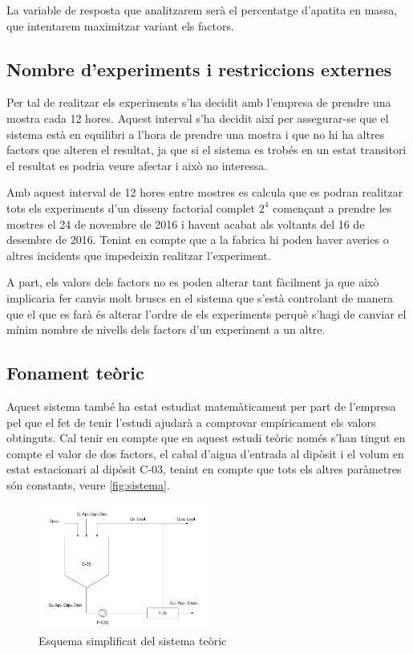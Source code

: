 \documentclass[a4paper]{article}
\begin{document}
La variable de resposta que analitzarem serà el percentatge d'apatita en massa, que intentarem maximitzar variant els factors.


\subsection{Nombre d'experiments i restriccions externes}
Per tal de realitzar els experiments s'ha decidit amb l'empresa de prendre una mostra cada 12 hores. Aquest interval s'ha decidit així per assegurar-se que el sistema està en equilibri a l'hora de prendre una mostra i que no hi ha altres factors que alteren el resultat, ja que si el sistema es trobés en un estat transitori el resultat es podria veure afectar i això no interessa.

Amb aquest interval de 12 hores entre mostres es calcula que es podran realitzar tots els experiments d'un disseny factorial complet $2^4$ començant a prendre les mostres el 24 de novembre de 2016 i havent acabat als voltants del 16 de desembre de 2016. Tenint en compte que a la fabrica hi poden haver averies o altres incidents que impedeixin realitzar l'experiment.

A part, els valors dels factors no es poden alterar tant fàcilment ja que això implicaria fer canvis molt bruscs en el sistema que s'està controlant de manera que el que es farà és alterar l'ordre de els experiments perquè s'hagi de canviar el mínim nombre de nivells dels factors d'un experiment a un altre.

\newpage

\subsection{Fonament teòric}
Aquest sistema també ha estat estudiat matemàticament per part de l'empresa pel que el fet de tenir l'estudi ajudarà a comprovar empíricament els valors obtinguts. Cal tenir en compte que en aquest estudi teòric només s'han tingut en compte el valor de dos factors, el cabal d'aigua d'entrada al dipòsit i el volum en estat estacionari al dipòsit C-03, tenint en compte que tots els altres paràmetres són constants, veure \autoref{fig:sistema}.

\begin{figure}[H]
		\centering
		\includegraphics[width=0.5\textwidth]{images/graphs/sistema}
		\caption{Esquema simplificat del sistema teòric}
		\label{fig:sistema}
\end{figure}
\end{document}

